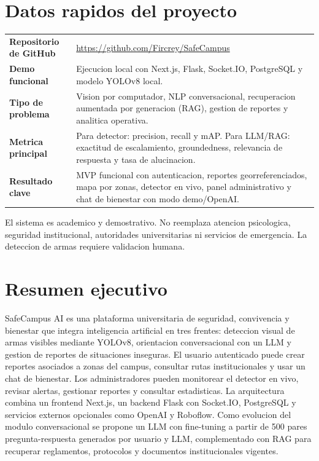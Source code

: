 \documentclass[11pt,letterpaper]{article}
\begin{document}
\clearpage
\hypersetup{pageanchor=true}

\section*{Datos rapidos del proyecto}

\begin{tabularx}{\textwidth}{P{4.2cm}Y}
    \toprule
    \textbf{Repositorio de GitHub} & \url{https://github.com/Fircrey/SafeCampus} \\
    \textbf{Demo funcional} & Ejecucion local con Next.js, Flask, Socket.IO, PostgreSQL y modelo YOLOv8 local. \\
    \textbf{Tipo de problema} & Vision por computador, NLP conversacional, recuperacion aumentada por generacion (RAG), gestion de reportes y analitica operativa. \\
    \textbf{Metrica principal} & Para detector: precision, recall y mAP. Para LLM/RAG: exactitud de escalamiento, groundedness, relevancia de respuesta y tasa de alucinacion. \\
    \textbf{Resultado clave} & MVP funcional con autenticacion, reportes georreferenciados, mapa por zonas, detector en vivo, panel administrativo y chat de bienestar con modo demo/OpenAI. \\
    \bottomrule
\end{tabularx}

\begin{nota}
El sistema es academico y demostrativo. No reemplaza atencion psicologica, seguridad institucional, autoridades universitarias ni servicios de emergencia. La deteccion de armas requiere validacion humana.
\end{nota}

\section{Resumen ejecutivo}

SafeCampus AI es una plataforma universitaria de seguridad, convivencia y bienestar que integra inteligencia artificial en tres frentes: deteccion visual de armas visibles mediante YOLOv8, orientacion conversacional con un LLM y gestion de reportes de situaciones inseguras. El usuario autenticado puede crear reportes asociados a zonas del campus, consultar rutas institucionales y usar un chat de bienestar. Los administradores pueden monitorear el detector en vivo, revisar alertas, gestionar reportes y consultar estadisticas. La arquitectura combina un frontend Next.js, un backend Flask con Socket.IO, PostgreSQL y servicios externos opcionales como OpenAI y Roboflow. Como evolucion del modulo conversacional se propone un LLM con fine-tuning a partir de 500 pares pregunta-respuesta generados por usuario y LLM, complementado con RAG para recuperar reglamentos, protocolos y documentos institucionales vigentes.
\end{document}
